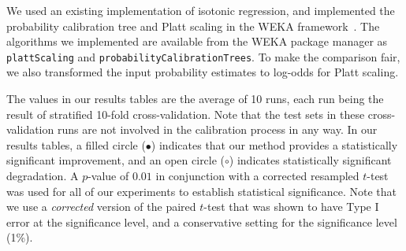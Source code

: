 \documentclass[wcp]{jmlr}
\begin{document}
We used an existing implementation of isotonic regression, and implemented the probability calibration tree and Platt scaling in the WEKA framework~\citep{hall2009weka}. The algorithms we implemented are available from the WEKA package manager as \texttt{plattScaling} and \texttt{probabilityCalibrationTrees}. To make the comparison fair, we also transformed the input probability estimates to log-odds for Platt scaling.

The values in our results tables are the average of 10 runs, each run being the result of stratified 10-fold cross-validation. Note that the test sets in these cross-validation runs are not involved in the calibration process in any way. In our results tables, a filled circle ($\bullet$) indicates that our method provides a statistically significant improvement, and an open circle ($\circ$) indicates statistically significant degradation. A $p$-value of $0.01$ in conjunction with a corrected resampled $t$-test~\citep{nadeau2000inference} was used for all of our experiments to establish statistical significance. Note that we use a {\em corrected} version of the paired $t$-test that was shown to have Type I error at the significance level, and a conservative setting for the significance level (1\%). 
\end{document}

